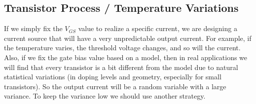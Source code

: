 \subsection{Transistor Process / Temperature Variations}
If we simply fix the $V_{GS}$ value to realize a specific current, we are designing a current source that will have a very unpredictable output current.  For example, if the temperature varies, the threshold voltage changes, and so will the current.  Also, if we fix the gate bias value based on a model, then in real applications we will find that every transistor is a bit different from the model due to natural statistical variations (in doping levels and geometry, especially for small transistors).  So the output current will be a random variable with a large variance.  To keep the variance low we should use another strategy.

